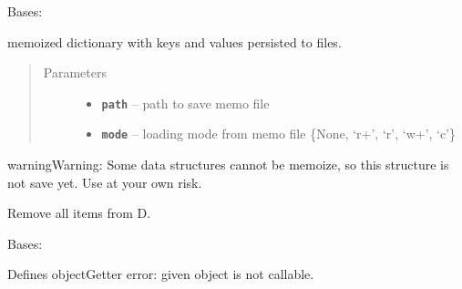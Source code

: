 \documentclass[letterpaper,10pt,english]{sphinxmanual}
\begin{document}

\begin{fulllineitems}
\label{RRtoolbox.lib:RRtoolbox.lib.cache.memoizedDict}
Bases: 

memoized dictionary with keys and values persisted to files.
\begin{quote}\begin{description}
\item[{Parameters}] \leavevmode\begin{itemize}
\item {} 
\textbf{\texttt{path}} -- path to save memo file

\item {} 
\textbf{\texttt{mode}} -- loading mode from memo file \{None, `r+', `r', `w+', `c'\}

\end{itemize}

\end{description}\end{quote}

\begin{notice}{warning}{Warning:}
Some data structures cannot be memoize, so this structure is not save yet.
Use at your own risk.
\end{notice}

\begin{fulllineitems}
\label{RRtoolbox.lib:RRtoolbox.lib.cache.memoizedDict.clear}
Remove all items from D.

\end{fulllineitems}


\end{fulllineitems}


\begin{fulllineitems}
\label{RRtoolbox.lib:RRtoolbox.lib.cache.notCallable}
Bases: 

Defines objectGetter error: given object is not callable.

\end{fulllineitems}
\end{document}
